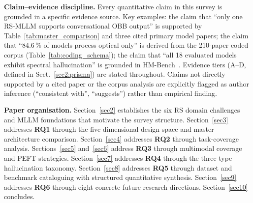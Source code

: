 \textbf{Claim--evidence discipline.}
Every quantitative claim in this survey is grounded in a specific evidence
source. Key examples: the claim that ``only one RS-MLLM supports conversational
OBB output'' is supported by Table~\ref{tab:master_comparison} and three cited
primary model papers; the claim that ``84.6\,\% of models process optical only''
is derived from the 210-paper coded corpus (Table~\ref{tab:coding_schema}); the
claim that ``all 18 evaluated models exhibit spectral hallucination'' is grounded
in HM-Bench~\cite{hmbench2026}. Evidence tiers (A--D, defined in
Sect.~\ref{sec2:prisma}) are stated throughout. Claims not directly supported by
a cited paper or the corpus analysis are explicitly flagged as author inference
(``consistent with'', ``suggests'') rather than empirical finding.

\textbf{Paper organisation.}
Section~\ref{sec2} establishes the six RS domain challenges and MLLM foundations
that motivate the survey structure. Section~\ref{sec3} addresses \textbf{RQ1} through
the five-dimensional design space and master architecture comparison. Section~\ref{sec4}
addresses \textbf{RQ2} through task-coverage analysis. Sections~\ref{sec5}
and~\ref{sec6} address \textbf{RQ3} through multimodal coverage and PEFT strategies.
Section~\ref{sec7} addresses \textbf{RQ4} through the three-type hallucination taxonomy.
Section~\ref{sec8} addresses \textbf{RQ5} through dataset and benchmark cataloguing
with structured quantitative synthesis. Section~\ref{sec9} addresses \textbf{RQ6}
through eight concrete future research directions. Section~\ref{sec10} concludes.
